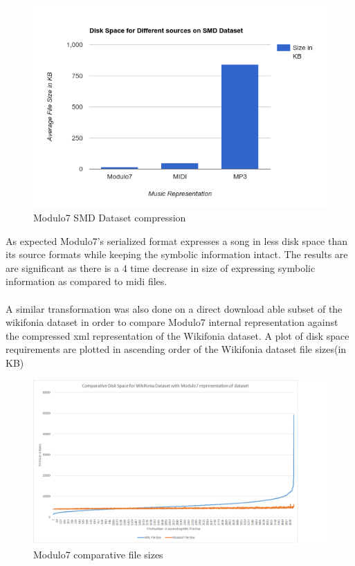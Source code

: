 \begin{figure}[!htb]
\centering
\includegraphics[width=\textwidth]{Modulo7SMDBarGraph.png}
\makeatletter
\let\@currsize\normalsize
\caption{Modulo7 SMD Dataset compression}
\label{fig:figure}
\end{figure}
\noindent As expected Modulo7's serialized format expresses a song in less disk space than its source formats while keeping the symbolic information intact. The results are are significant as there is a 4 time decrease in size of expressing symbolic information as compared to midi files. \\\\
A similar transformation was also done on a direct download able subset of the wikifonia dataset \cite{WikifoniaDataset} in order to compare Modulo7 internal representation against the compressed xml representation of the Wikifonia dataset. A plot of disk space requirements are plotted in ascending order of the Wikifonia dataset file sizes(in KB) \\
\begin{figure}[!htb]
\centering
\includegraphics[width=\textwidth]{M7Graph.png}
\makeatletter
\let\@currsize\normalsize
\caption{Modulo7 comparative file sizes}
\label{fig:filesizes}
\end{figure}

